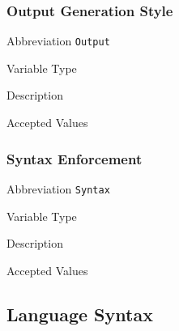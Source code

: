 \subsubsection{Output Generation Style}
\label{subsec:output}

\begin{AlignedDesc}
  \item[Abbreviation] \texttt{Output}

  \item[Variable Type]

  \item[Description]

  \item[Accepted Values]

  \begin{AlignedDesc}
    \item[\textellipsis]
  \end{AlignedDesc}

\end{AlignedDesc}

\subsubsection{Syntax Enforcement}
\label{subsec:syntax}

\begin{AlignedDesc}
  \item[Abbreviation] \texttt{Syntax}

  \item[Variable Type]

  \item[Description]

  \item[Accepted Values]

  \begin{AlignedDesc}
    \item[\textellipsis]
  \end{AlignedDesc}

\end{AlignedDesc}


\subsection{Language Syntax}
\label{sec:languagesyntax}

